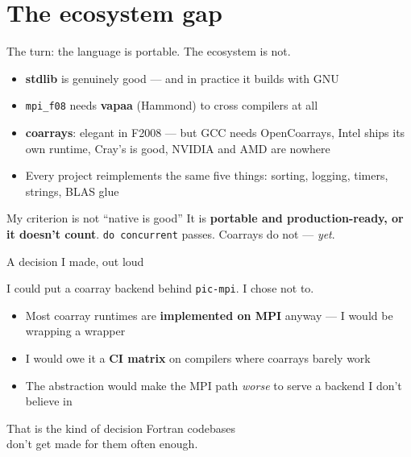 \documentclass[aspectratio=169]{beamer}
\begin{document}
\section{The ecosystem gap}

\begin{frame}{The turn: the language is portable. The ecosystem is not.}
  \begin{itemize}\setlength\itemsep{4pt}
    \item \textbf{stdlib} is genuinely good --- and in practice it builds with GNU
    \item \texttt{mpi\_f08} needs \textbf{vapaa} (Hammond) to cross compilers at all
    \item \textbf{coarrays}: elegant in F2008 --- but GCC needs OpenCoarrays, Intel ships its own
      runtime, Cray's is good, NVIDIA and AMD are nowhere
    \item Every project reimplements the same five things: sorting, logging, timers, strings, BLAS glue
  \end{itemize}
  \vfill
  \begin{alertblock}{My criterion is not ``native is good''}
    It is \textbf{portable and production-ready, or it doesn't count}.
    \texttt{do concurrent} passes. Coarrays do not --- \emph{yet}.
  \end{alertblock}
\end{frame}

\begin{frame}{A decision I made, out loud}
  \begin{cookiequote}
    I could put a coarray backend behind \texttt{pic-mpi}. I chose not to.
  \end{cookiequote}
  \vspace{.4em}
  \begin{itemize}
    \item Most coarray runtimes are \textbf{implemented on MPI} anyway --- I would be wrapping a wrapper
    \item I would owe it a \textbf{CI matrix} on compilers where coarrays barely work
    \item The abstraction would make the MPI path \emph{worse} to serve a backend I don't believe in
  \end{itemize}
  \vfill
  \begin{exampleblock}{}
    \centering That is the kind of decision Fortran codebases \\ don't get made for them often enough.
  \end{exampleblock}
\end{frame}
\end{document}
